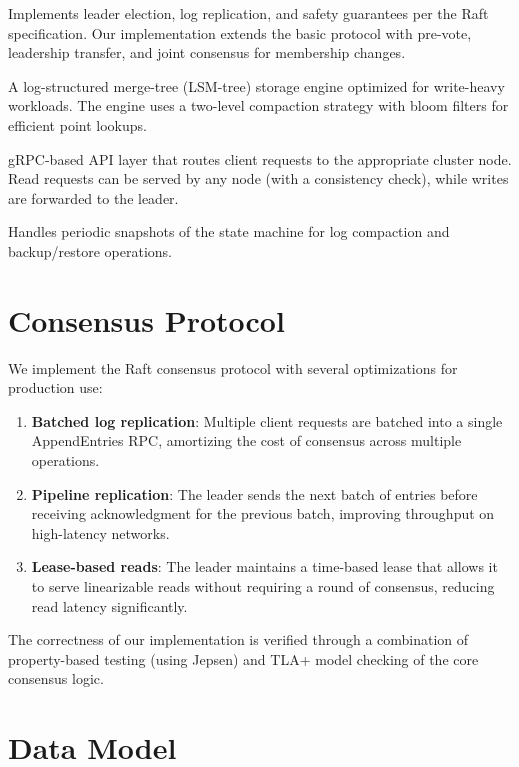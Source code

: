 \documentclass[12pt,a4paper]{report}
\begin{document}
\begin{description}[style=nextline, leftmargin=2em]
  \item[Raft Consensus Module] Implements leader election, log replication, and safety guarantees per the Raft specification. Our implementation extends the basic protocol with pre-vote, leadership transfer, and joint consensus for membership changes.
  \item[Storage Engine] A log-structured merge-tree (LSM-tree) storage engine optimized for write-heavy workloads. The engine uses a two-level compaction strategy with bloom filters for efficient point lookups.
  \item[API Gateway] gRPC-based API layer that routes client requests to the appropriate cluster node. Read requests can be served by any node (with a consistency check), while writes are forwarded to the leader.
  \item[Snapshot Manager] Handles periodic snapshots of the state machine for log compaction and backup/restore operations.
\end{description}

\section{Consensus Protocol}

We implement the Raft consensus protocol with several optimizations for production use:

\begin{enumerate}[itemsep=4pt]
  \item \textbf{Batched log replication}: Multiple client requests are batched into a single AppendEntries RPC, amortizing the cost of consensus across multiple operations.
  \item \textbf{Pipeline replication}: The leader sends the next batch of entries before receiving acknowledgment for the previous batch, improving throughput on high-latency networks.
  \item \textbf{Lease-based reads}: The leader maintains a time-based lease that allows it to serve linearizable reads without requiring a round of consensus, reducing read latency significantly.
\end{enumerate}

The correctness of our implementation is verified through a combination of property-based testing (using Jepsen) and TLA+ model checking of the core consensus logic.

\section{Data Model}
\end{document}
